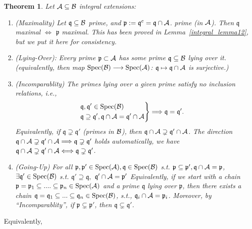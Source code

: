 \documentclass[11pt]{article}
\newtheorem{thm}{Theorem}[section]
\newcommand{\scp}{{\mathfrak p}}
\newcommand{\scq}{\mathfrak q}
\newcommand{\cala}{{\cal A}}
\newcommand{\calb}{{\cal B}}
\newcommand{\Lrta}{\Longrightarrow}
\newcommand{\lrta}{\longrightarrow}
\newcommand{\Llrta}{\Longleftrightarrow}
\begin{document}
\begin{thm}\label{thm:integral_extension_goingup}
Let $\cala\subseteq \calb$ integral extensions:
\begin{enumerate}[label=(\roman*)]
\item (Maximality)  Let $\scq\subseteq \calb$ prime, and $\scp:=\scq^{c}=\scq\cap \cala$. prime (in $\cala$). Then 
$\scq$ maximal $\Llrta$ $\scp$ maximal. This has been proved in Lemma~\ref{integral_lemma12}, but we put it here for consistency.
\item (Lying-Over): Every  prime $\scp\subset\cala$ has some prime $\scq\subseteq \calb$ lying over it. (equivalently, then map $\text{Spec}(\calb)\lrta \text{Spec}(\cala)$: $\scq\mapsto \scq\cap \cala$ is surjective.)

\item (Incomparablity) The primes lying over a given prime satisfy no inclusion relations, i.e.,
$$
\left.
\begin{aligned}
&\scq,\scq'\in \text{Spec}(\calb)\\
& \scq\supseteq\scq', \scq\cap\cala=\scq'\cap\cala
\end{aligned}
\right\}\Lrta \scq=\scq'.
$$
Equivalently, if $\scq\supsetneq \scq'$ (primes in $\calb$), then $\scq\cap\cala\supsetneq \scq'\cap\cala$. The direction $\scq\cap\cala\supsetneq \scq'\cap\cala\Lrta \scq\supsetneq \scq'$ holds automatically, we have $\scq\cap\cala\supsetneq \scq'\cap\cala\Llrta \scq\supsetneq \scq'$. 
\item (Going-Up) For all $\scp,\scp'\in \text{Spec}(\cala),\scq\in \text{Spec}(\calb)$ s.t. $\scp\subseteq \scp',\scq\cap\cala=\scp$, \\
$\exists \scq'\in \text{Spec}(\calb)$ s.t. $\scq'\supseteq \scq,$ $\scq'\cap \cala=\scp'$
Equivalently, if we start with a chain 
$\scp=\scp_1\subseteq ....\subseteq \scp_n\in \text{Spec}(\cala)$ and a prime $\scq$ lying over $\scp$, then there exists a chain 
$\scq=\scq_1\subseteq ...\subseteq \scq_n\in \text{Spec}(\calb)$, s.t., $\scq_i\cap\cala=\scp_i$. 
Moreover, by ``Incomparablity'', if $\scp\subsetneq \scp'$, then $\scq\subsetneq \scq'$.
\end{enumerate}
\end{thm}

Equivalently,
\end{document}
